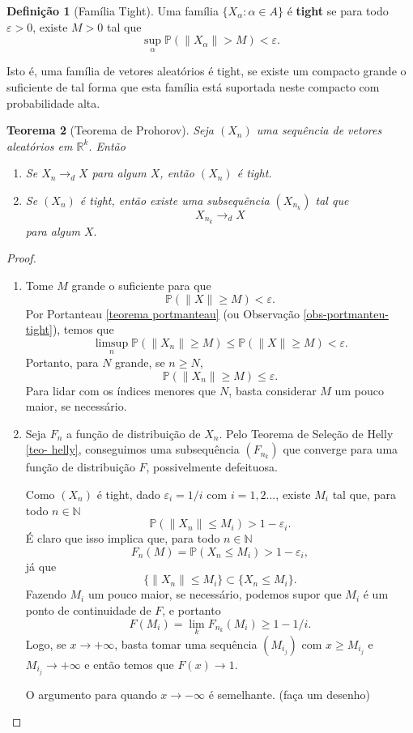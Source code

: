 \documentclass[12pt,a4paper,oneside]{book}
\newtheorem{theorem}{Teorema}[section]
\theoremstyle{definition}
\newtheorem{definition}[theorem]{Defini\c{c}\~ao}
\theoremstyle{remark}
\numberwithin{equation}{section}
\newcommand{\R}{\mathbb{R}}
\newcommand{\e}{\varepsilon}
\newcommand{\N}{\mathbb{N}}
\newcommand{\pr}{\mathbb{P}}
\begin{document}
\begin{definition}[Família Tight]\label{def - tight}   Uma família $\{X_\alpha:\alpha\in A\}$ é \textbf{tight} se para todo $\e>0$, existe $M>0 $ tal que 
$$\sup_\alpha \pr(\|X_\alpha\|>M)<\e. $$
\end{definition}
\begin{tcolorbox}[colback = yellow!60] Isto é, uma família de vetores aleatórios é tight, se existe um compacto grande o suficiente de tal forma que esta família está suportada neste compacto com probabilidade alta.
\end{tcolorbox}






\begin{theorem}[Teorema de Prohorov]\label{teo - prohorov}  Seja $(X_n)$ uma sequência de vetores aleatórios em $\R^k$.  Então
\begin{enumerate}
\item Se $X_n \rightarrow_d X$ para algum $X$,  então $(X_n)$ é tight.
\item Se $(X_n)$ é tight, então existe uma subsequência $(X_{n_k})$ tal que 
$$X_{n_k}\rightarrow_d X$$
para algum $X.$ 
\end{enumerate}
\end{theorem}
\begin{proof}
$ $
\begin{enumerate}
\item Tome $M$ grande o suficiente para que
$$\pr(\|X\|\geq M)< \e. $$
Por Portanteau \ref{teorema portmanteau} (ou Observação \ref{obs-portmanteu-tight}), temos que
$$\limsup_n \pr(\|X_n\|\geq M)\leq \pr(\|X\|\geq M)<\e. $$
Portanto,  para $N$ grande, se $n\geq N$, 
$$ \pr(\|X_n\|\geq M)\leq \e. $$
Para lidar com os índices menores que $N$, basta considerar $M$ um pouco maior, se necessário.

\item Seja $F_n$ a função de distribuição de $X_n$. Pelo Teorema de Seleção de Helly \ref{teo- helly}, conseguimos uma subsequência $(F_{n_k})$ que converge para uma função de distribuição  $F$,  possivelmente defeituosa. 

Como $(X_n)$ é tight, dado $\e_i = 1/i$ com $i= 1,2\dots$, existe $M_i$ tal que, para todo $n\in \N$
$$\pr(\|X_n\|\leq M_i)>1-\e_i. $$
É claro que isso implica que, para todo $n\in \N$
$$F_n(M) = \pr(X_n \leq M_i)>1-\e_i, $$
já que
$$\{\|X_n\|\leq M_i\}\subset \{X_n \leq M_i\}. $$
Fazendo $M_i$ um pouco maior, se necessário, podemos supor que $M_i$ é um ponto de continuidade de $F$, e portanto
$$F(M_i) = \lim_kF_{n_k}(M_i)\geq 1-1/i.  $$
Logo, se $x\rightarrow +\infty$, basta tomar uma sequência $(M_{i_j})$ com  $x\geq M_{i_j}$ e $M_{i_j} \rightarrow +\infty$ e  então temos que $F(x)\rightarrow 1$.

O argumento para quando $x\rightarrow -\infty$ é semelhante. (faça um desenho)

\end{enumerate}
\end{proof}
\end{document}
